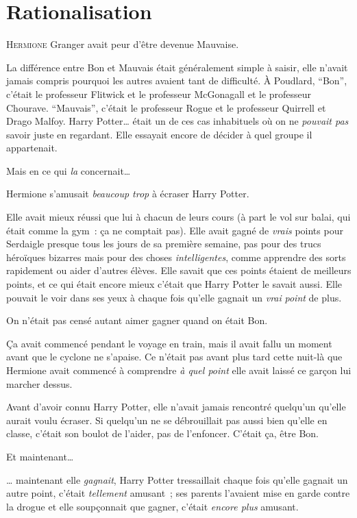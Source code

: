 \chapter{Rationalisation}

\lettrine{H}{ermione} Granger avait peur d'être devenue Mauvaise.

\hplettrineextrapara
La différence entre Bon et Mauvais était généralement simple à saisir, elle n'avait jamais compris pourquoi les autres avaient tant de difficulté. À Poudlard, “Bon”, c'était le professeur Flitwick et le professeur McGonagall et le professeur Chourave. “Mauvais”, c'était le professeur Rogue et le professeur Quirrell et Drago Malfoy. Harry Potter… était un de ces cas inhabituels où on ne \emph{pouvait pas} savoir juste en regardant. Elle essayait encore de décider à quel groupe il appartenait.

Mais en ce qui \emph{la} concernait…

Hermione s'amusait \emph{beaucoup trop} à écraser Harry Potter.

Elle avait mieux réussi que lui à chacun de leurs cours (à part le vol sur balai, qui était comme la gym~: ça ne comptait pas). Elle avait gagné de \emph{vrais} points pour Serdaigle presque tous les jours de sa première semaine, pas pour des trucs héroïques bizarres mais pour des choses \emph{intelligentes}, comme apprendre des sorts rapidement ou aider d'autres élèves. Elle savait que ces points étaient de meilleurs points, et ce qui était encore mieux c'était que Harry Potter le savait aussi. Elle pouvait le voir dans ses yeux à chaque fois qu'elle gagnait un \emph{vrai} \emph{point} de plus.

On n'était pas censé autant aimer gagner quand on était Bon.

Ça avait commencé pendant le voyage en train, mais il avait fallu un moment avant que le cyclone ne s'apaise. Ce n'était pas avant plus tard cette nuit-là que Hermione avait commencé à comprendre \emph{à quel point} elle avait laissé ce garçon lui marcher dessus.

Avant d'avoir connu Harry Potter, elle n'avait jamais rencontré quelqu'un qu'elle aurait voulu écraser. Si quelqu'un ne se débrouillait pas aussi bien qu'elle en classe, c'était son boulot de l'aider, pas de l'enfoncer. C'était ça, être Bon.

Et maintenant…

… maintenant elle \emph{gagnait}, Harry Potter tressaillait chaque fois qu'elle gagnait un autre point, c'était \emph{tellement} amusant~; ses parents l'avaient mise en garde contre la drogue et elle soupçonnait que gagner, c'était \emph{encore plus} amusant.

